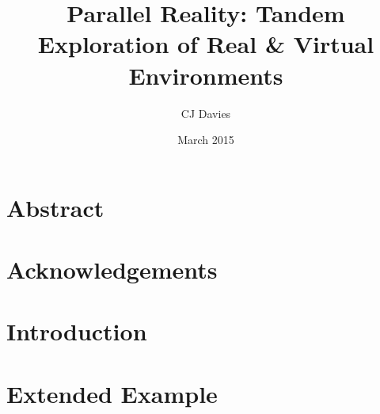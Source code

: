\documentclass{report}
\begin{document}
\title{Parallel Reality: Tandem Exploration of Real \& Virtual Environments}
\date{March 2015}
\author{CJ Davies}





\chapter*{Abstract}



\chapter*{Acknowledgements}



\tableofcontents


\listoffigures


\listoftables


\chapter{Introduction}



\chapter{Extended Example}


\end{document}

